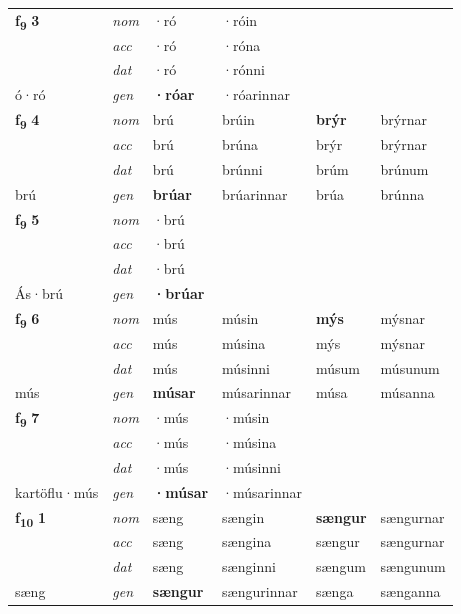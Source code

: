 \begin{longtable}[l]{X>{\footnotesize\itshape}XXXXX}
\multirow{3}{*}{{{\textbf{f{\textsubscript{9}}} \Large{\textbf{3}}}}} & nom & ·ró & ·róin & \textbf{} &  \\*
 & acc & ·ró & ·róna &  &  \\*
 & dat & ·ró & ·rónni &  &  \\*
 {\footnotesize{ó\allowbreak ·ró}} & gen & \textbf{·róar} & ·róarinnar &  &  \\
\cmidrule{1-6}

\multirow{3}{*}{{{\textbf{f{\textsubscript{9}}} \Large{\textbf{4}}}}} & nom & brú & brúin & \textbf{brýr} & brýrnar \\*
 & acc & brú & brúna & brýr & brýrnar \\*
 & dat & brú & brúnni & brúm & brúnum \\*
 {\footnotesize{brú}} & gen & \textbf{brúar} & brúarinnar & brúa & brúnna \\
\cmidrule{1-6}

\multirow{3}{*}{{{\textbf{f{\textsubscript{9}}} \Large{\textbf{5}}}}} & nom & ·brú &  & \textbf{} &  \\*
 & acc & ·brú &  &  &  \\*
 & dat & ·brú &  &  &  \\*
 {\footnotesize{Ás\allowbreak ·brú}} & gen & \textbf{·brúar} &  &  &  \\
\cmidrule{1-6}

\multirow{3}{*}{{{\textbf{f{\textsubscript{9}}} \Large{\textbf{6}}}}} & nom & mús & músin & \textbf{mýs} & mýsnar \\*
 & acc & mús & músina & mýs & mýsnar \\*
 & dat & mús & músinni & músum & músunum \\*
 {\footnotesize{mús}} & gen & \textbf{músar} & músarinnar & músa & músanna \\
\cmidrule{1-6}

\multirow{3}{*}{{{\textbf{f{\textsubscript{9}}} \Large{\textbf{7}}}}} & nom & ·mús & ·músin & \textbf{} &  \\*
 & acc & ·mús & ·músina &  &  \\*
 & dat & ·mús & ·músinni &  &  \\*
 {\footnotesize{kartöflu\allowbreak ·mús}} & gen & \textbf{·músar} & ·músarinnar &  &  \\
\cmidrule{1-6}

\multirow{3}{*}{{{\textbf{f{\textsubscript{10}}} \Large{\textbf{1}}}}} & nom & sæng & sængin & \textbf{sængur} & sængurnar \\*
 & acc & sæng & sængina & sængur & sængurnar \\*
 & dat & sæng & sænginni & sængum & sængunum \\*
 {\footnotesize{sæng}} & gen & \textbf{sængur} & sængurinnar & sænga & sænganna \\
\cmidrule{1-6}


\end{longtable}
